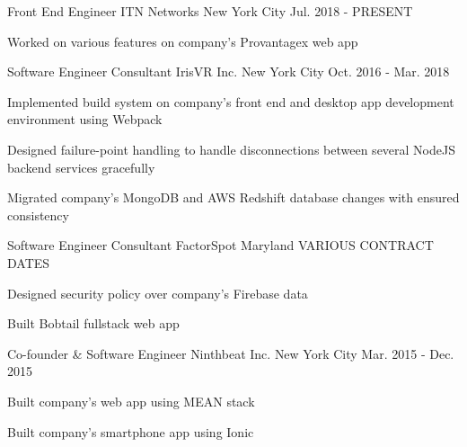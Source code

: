 

\begin{cventries}

  \cventry
    {Front End Engineer} %
    {ITN Networks} %
    {New York City} %
    {Jul. 2018 - PRESENT} %
    {
      \begin{cvitems} %
        \item {Worked on various features on company's Provantagex web app}
      \end{cvitems}
    }

  \cventry
    {Software Engineer Consultant} %
    {IrisVR Inc.} %
    {New York City} %
    {Oct. 2016 - Mar. 2018} %
    {
      \begin{cvitems} %
        \item {Implemented build system on company's front end and desktop app development environment using Webpack}
        \item {Designed failure-point handling to handle disconnections between several NodeJS backend services gracefully}
        \item {Migrated company's MongoDB and AWS Redshift database changes with ensured consistency}
      \end{cvitems}
    }

  \cventry
    {Software Engineer Consultant} %
    {FactorSpot} %
    {Maryland} %
    {VARIOUS CONTRACT DATES} %
    {
      \begin{cvitems} %
        \item {Designed security policy over company's Firebase data}
        \item {Built Bobtail fullstack web app}
      \end{cvitems}
    }

  \cventry
    {Co-founder \& Software Engineer} %
    {Ninthbeat Inc.} %
    {New York City} %
    {Mar. 2015 - Dec. 2015} %
    {
      \begin{cvitems} %
        \item {Built company's web app using MEAN stack}
        \item {Built company's smartphone app using Ionic}
      \end{cvitems}
    }


\end{cventries}
